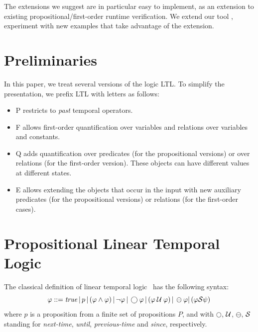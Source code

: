 The extensions we suggest are in particular easy to implement, as an extension to existing propositional/first-order runtime verification. We extend our tool \dejavu, experiment with new examples that take advantage of the extension.
\fi

\section{Preliminaries}
\label{sec:prelim}

In this paper, we treat several versions of the logic LTL. To simplify
the presentation, we prefix LTL with letters as follows:

\begin{itemize}
\item{P} restricts to {\em past} temporal operators.
\item{F} allows first-order quantification over
variables and relations over variables and constants.
\item{Q} adds quantification over predicates (for the propositional versions)
or over relations (for the first-order version). These objects can have different values at different states.
\item{E} allows extending the objects that occur in the input with
new auxiliary predicates (for the propositional versions) or relations (for the first-order cases).
\end{itemize}



\newcommand\eventty{\mathbb{E}}
\newcommand\setof[1]{\mathcal{P}(#1)}


\section{Propositional Linear Temporal Logic}

The classical definition of linear temporal logic~\cite{MP} has the following syntax:
\[ \varphi ::= \mathit{true} \, | \,  p \, | \, ( \varphi \wedge \varphi ) \, |  \, \neg  \varphi \, |   \, \bigcirc \varphi \, |  
\, ( \varphi \mathbin{\mathcal{U}} \varphi ) \,|  \, \ominus \varphi |
   \, ( \varphi {\cal S} \psi ) \,  \]
where $p$ is a proposition from a finite set of propositions $P$, and with $\bigcirc$, $\mathbin{\mathcal{U}}$, $\ominus$, ${\cal S}$ standing for {\em next-time}, 
{\em until}, {\em previous-time} and {\em since}, respectively.


